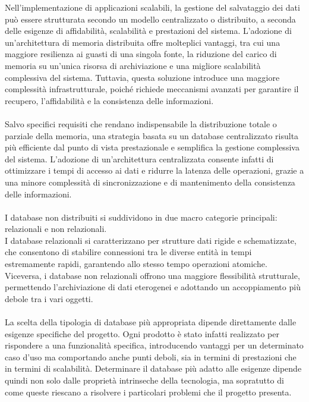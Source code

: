 Nell’implementazione di applicazioni scalabili, la gestione del salvataggio dei dati
può essere strutturata secondo un modello centralizzato o distribuito,
a seconda delle esigenze di affidabilità, scalabilità e prestazioni del sistema.
L’adozione di un’architettura di memoria distribuita offre molteplici vantaggi,
tra cui una maggiore resilienza ai guasti di una singola fonte,
la riduzione del carico di memoria su un'unica risorsa di archiviazione e
una migliore scalabilità complessiva del sistema.
Tuttavia, questa soluzione introduce una maggiore complessità infrastrutturale,
poiché richiede meccanismi avanzati per garantire il recupero,
l'affidabilità e la consistenza delle informazioni.\\
\\
Salvo specifici requisiti che rendano indispensabile la distribuzione totale o parziale della memoria,
una strategia basata su un database centralizzato risulta più efficiente
dal punto di vista prestazionale e semplifica la gestione complessiva del sistema.
L’adozione di un’architettura centralizzata consente infatti
di ottimizzare i tempi di accesso ai dati e ridurre la latenza delle operazioni,
grazie a una minore complessità di sincronizzazione e
di mantenimento della consistenza delle informazioni.\\
\\
I database non distribuiti si suddividono in due macro categorie principali: relazionali e non relazionali.\\
I database relazionali si caratterizzano per strutture dati rigide e schematizzate,
che consentono di stabilire connessioni tra le diverse entità in tempi estremamente rapidi,
garantendo allo stesso tempo operazioni atomiche.
Viceversa, i database non relazionali offrono una maggiore flessibilità strutturale,
permettendo l’archiviazione di dati eterogenei e adottando un accoppiamento più debole tra i vari oggetti. \\
\\
La scelta della tipologia di database più appropriata dipende direttamente
dalle esigenze specifiche del progetto.
Ogni prodotto è stato infatti realizzato per rispondere a una funzionalità specifica,
introducendo vantaggi per un determinato caso d'uso ma comportando anche punti deboli,
sia in termini di prestazioni che in termini di scalabilità.
Determinare il database più adatto alle esigenze dipende
quindi non solo dalle proprietà intrinseche della tecnologia,
ma sopratutto di come queste riescano a risolvere i particolari problemi che il progetto presenta.
\clearpage

